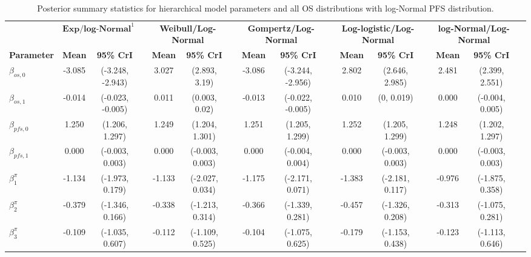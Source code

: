 \documentclass[AMA,STIX1COL]{WileyNJD-v2}
\begin{document}
\begin{landscape}
\begin{center}
\begin{table}[t]
\caption{Posterior summary statistics for hierarchical model parameters and all OS distributions with log-Normal PFS distribution. \label{tab:post_hier_pfs_lnormal}}
\centering
\begin{tabular}{l c c c c c c c c c c c c c c c}
\toprule
\multicolumn{1}{l}{} & \multicolumn{2}{c}{$\textbf{Exp/log-Normal}^1$} & & \multicolumn{2}{c}{\textbf{Weibull/Log-Normal}} & & \multicolumn{2}{c}{\textbf{Gompertz/Log-Normal}} & & \multicolumn{2}{c}{\textbf{Log-logistic/Log-Normal}} & & \multicolumn{2}{c}{\textbf{log-Normal/Log-Normal}}\\
\cmidrule{2-3}\cmidrule{5-6}\cmidrule{8-9}\cmidrule{11-12}\cmidrule{14-15}
\textbf{Parameter} & \textbf{Mean} & \textbf{95\% CrI} & & \textbf{Mean} & \textbf{95\% CrI} & & \textbf{Mean} & \textbf{95\% CrI} & & \textbf{Mean} & \textbf{95\% CrI} & & \textbf{Mean} & \textbf{95\% CrI}\\
\midrule
$\beta_{os, 0}$ & -3.085 & (-3.248, -2.943) &  & 3.027 & (2.893, 3.19) &  & -3.086 & (-3.244, -2.956) &  & 2.802 & (2.646, 2.985) &  & 2.481 & (2.399, 2.551) & \\
$\beta_{os, 1}$ & -0.014 & (-0.023, -0.005) &  & 0.011 & (0.003, 0.02) &  & -0.013 & (-0.022, -0.005) &  & 0.010 & (0, 0.019) &  & 0.000 & (-0.004, 0.005) & \\
$\beta_{pfs, 0}$ & 1.250 & (1.206, 1.297) &  & 1.249 & (1.204, 1.301) &  & 1.251 & (1.205, 1.299) &  & 1.252 & (1.205, 1.299) &  & 1.248 & (1.202, 1.297) & \\
$\beta_{pfs, 1}$ & 0.000 & (-0.003, 0.003) &  & 0.000 & (-0.003, 0.003) &  & 0.000 & (-0.004, 0.004) &  & 0.000 & (-0.003, 0.003) &  & 0.000 & (-0.003, 0.003) & \\
$\beta^{\pi}_1$ & -1.134 & (-1.973, 0.179) &  & -1.133 & (-2.027, 0.034) &  & -1.175 & (-2.171, 0.071) &  & -1.383 & (-2.181, 0.117) &  & -0.976 & (-1.875, 0.358) & \\
$\beta^{\pi}_2$ & -0.379 & (-1.346, 0.166) &  & -0.338 & (-1.213, 0.314) &  & -0.366 & (-1.339, 0.281) &  & -0.457 & (-1.326, 0.208) &  & -0.313 & (-1.075, 0.281) & \\
$\beta^{\pi}_3$ & -0.109 & (-1.035, 0.607) &  & -0.112 & (-1.109, 0.525) &  & -0.104 & (-1.075, 0.625) &  & -0.179 & (-1.153, 0.438) &  & -0.123 & (-1.113, 0.646) & \\

\end{tabular}
\end{table}
\end{center}
\end{landscape}
\end{document}
